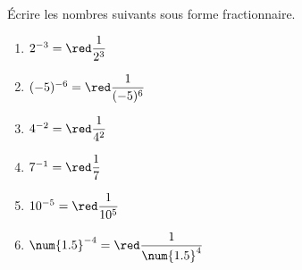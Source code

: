     Écrire les nombres suivants sous forme fractionnaire.
    \begin{multicols}{2}
            \begin{enumerate}
                \item $2^{-3}           ={\red \dfrac{1}{2^3}           }$
                \item $(-5)^{-6}        ={\red \dfrac{1}{(-5)^6}        }$
                \item $4^{-2}           ={\red \dfrac{1}{4^2}           }$
                \item $7^{-1}           ={\red \dfrac{1}{7}             }$
                \item $10^{-5}          ={\red \dfrac{1}{10^5}          }$
                \item $\num{1.5}^{-4}   ={\red \dfrac{1}{\num{1.5}^4}   }$
            \end{enumerate}
    \end{multicols}
